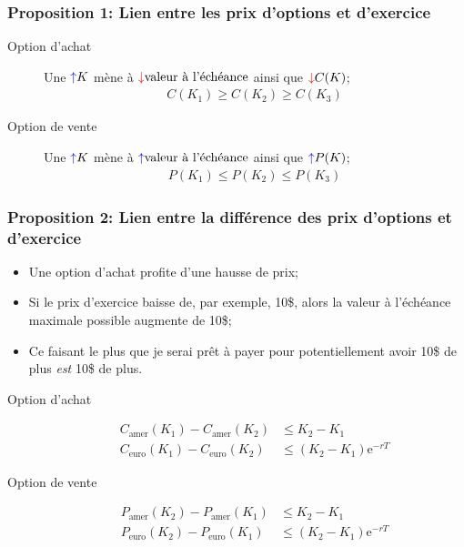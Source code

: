 \documentclass[10pt, french]{article}
\begin{document}
\begin{multicols*}{2}
\subsubsection*{Proposition 1:	Lien entre les prix d'options et d'exercice}
\begin{description}
	\item[Option d'achat]	Une ${\color{blue}\uparrow} K$ mène à ${\color{red}\downarrow} \text{valeur à l'échéance}$ ainsi que ${\color{red}\downarrow} C(K)$;
		\begin{align*}
		C(K_{1}) \geq	C(K_{2}) \geq	C(K_{3}) 
		\end{align*}
	\item[Option de vente]	Une ${\color{blue}\uparrow} K$ mène à ${\color{blue}\uparrow} \text{valeur à l'échéance}$ ainsi que ${\color{blue}\uparrow} P(K)$;
		\begin{align*}
		P(K_{1}) \leq	P(K_{2}) \leq	P(K_{3}) 
		\end{align*}
\end{description}

\subsubsection*{Proposition 2:	Lien entre la différence des prix d'options et d'exercice}
\begin{itemize}
	\item	Une option d'achat profite d'une hausse de prix;
	\item	Si le prix d'exercice baisse de, par exemple, 10\$, alors la valeur à l'échéance maximale possible augmente de 10\$;
	\item	Ce faisant le plus que je serai prêt à payer pour potentiellement avoir 10\$ de plus \textit{est} 10\$ de plus.
\end{itemize}

\begin{description}
	\item[Option d'achat]	
		\begin{align*}
		C_{\text{amer}}(K_{1}) - C_{\text{amer}}(K_{2}) &\leq K_{2} - K_{1}	\\
		C_{\text{euro}}(K_{1}) - C_{\text{euro}}(K_{2}) &\leq (K_{2} - K_{1})\textrm{e}^{-rT}
		\end{align*}
	\item[Option de vente]	
		\begin{align*}
		P_{\text{amer}}(K_{2}) - P_{\text{amer}}(K_{1}) &\leq K_{2} - K_{1}	\\
		P_{\text{euro}}(K_{2}) - P_{\text{euro}}(K_{1}) &\leq (K_{2} - K_{1})\textrm{e}^{-rT}
		\end{align*}
\end{description}


\end{multicols*}
\end{document}
